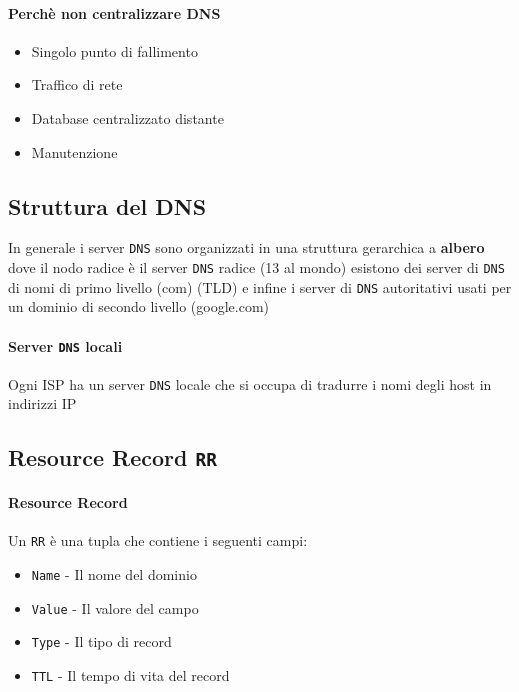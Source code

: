         \paragraph{Perchè non centralizzare DNS}
        \begin{itemize}
            \item Singolo punto di fallimento
            \item Traffico di rete
            \item Database centralizzato distante
            \item Manutenzione
        \end{itemize}
    \subsection{Struttura del DNS}
        In generale i server \texttt{DNS} sono organizzati in una struttura gerarchica a \textbf{albero} dove il nodo radice è il server \texttt{DNS} radice (13 al mondo) esistono dei server di \texttt{DNS} di nomi di primo livello (com) (TLD) e infine i server di \texttt{DNS} autoritativi usati per un dominio di secondo livello (google.com)
        \paragraph{Server \texttt{DNS} locali} Ogni ISP ha un server \texttt{DNS} locale che si occupa di tradurre i nomi degli host in indirizzi IP
    \subsection{Resource Record \texttt{RR}}
        \paragraph{Resource Record} Un \texttt{RR} è una tupla che contiene i seguenti campi:
        \begin{itemize}
            \item \texttt{Name} - Il nome del dominio
            \item \texttt{Value} - Il valore del campo
            \item \texttt{Type} - Il tipo di record
            \item \texttt{TTL} - Il tempo di vita del record
        \end{itemize}
